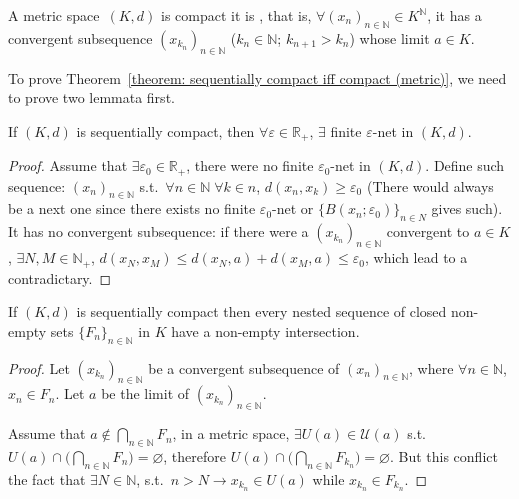 \documentclass[openany]{book}
\begin{document}
\begin{theorem}\label{theorem: sequentially compact iff compact (metric)}
	A metric space~$(K, d)$ is compact  it is , 
	that is, $\forall (x_n)_{n \in \mathbb N} \in K^\mathbb N$, it has a convergent subsequence $(x_{k_n})_{n \in \mathbb N}$ 
		($k_n \in \mathbb N$; $k_{n+1} > k_n$)
	whose limit $a \in K$.
\end{theorem}

To prove Theorem~\ref{theorem: sequentially compact iff compact (metric)}, we need to prove two lemmata first.

\begin{lemma}\label{lemma: finite e-net exists (metric, sequentially compact)}
	If $(K, d)$ is sequentially compact, then $\forall \varepsilon \in \mathbb R_+$, $\exists$ finite $\varepsilon$-net in $(K, d)$. 
\end{lemma}
\begin{proof}
	Assume that $\exists \varepsilon_0 \in \mathbb R_+$, there were no finite  $\varepsilon_0$-net in $(K, d)$. 
	Define such sequence: $ (x_n)_{n \in \mathbb N}$ s.t.\ $\forall n \in \mathbb N \; \forall k \in n$, $d(x_n, x_k) \geq \varepsilon_0$ 
		(There would always be a next one since there exists no finite $\varepsilon_0$-net or $\{B(x_n; \varepsilon_0)\}_{n \in N}$ gives such). 
		It has no convergent subsequence: 
		if there were a $(x_{k_n})_{n \in \mathbb N}$ convergent to $a\in K$, $\exists N,M\in\mathbb{N}_+$, $d(x_N, x_M)\leq d(x_N, a)+d(x_M, a)\leq \varepsilon_0$, which lead to a contradictary. 
\end{proof}

\begin{lemma}\label{lemma: intersection of closed nested sequence (sequentially compact)}
	If $(K, d)$ is sequentially compact then every nested sequence of closed non-empty sets $\{F_n\}_{n \in \mathbb N}$ in $K$ have a non-empty intersection.
\end{lemma}
\begin{proof}
	Let $(x_{k_n})_{n \in \mathbb N}$ be a convergent subsequence of $(x_n)_{n \in \mathbb N}$, where $\forall n \in \mathbb N$, $x_n \in F_n$. 
	Let $a$ be the limit of $(x_{k_n})_{n \in \mathbb N}$. 

	Assume that $a \notin \bigcap_{n \in \mathbb N} F_n$, in a metric space, $\exists U(a) \in \mathscr U(a)$ s.t.\ $U(a) \cap \big(\bigcap_{n \in \mathbb N} F_n \big) = \varnothing$, therefore $U(a) \cap \big(\bigcap_{n \in \mathbb N} F_{k_n} \big)=\varnothing$. 
	But this conflict the fact that $\exists N \in \mathbb N$, s.t.\ $n > N \to x_{k_n}\in U(a)$ while $x_{k_n} \in F_{k_n}$.
\end{proof}
\end{document}
